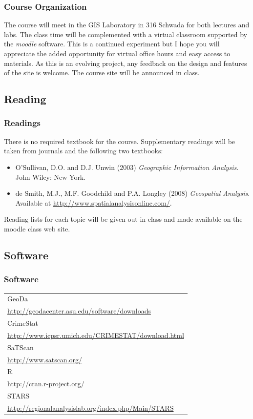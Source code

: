 \documentclass[nototal,handout]{beamer}
\begin{document}
\begin{frame}
	\frametitle{Course Organization}
  The course will meet in the GIS Laboratory in 316 Schwada for both
  lectures and labs. The class time will be complemented with a
  virtual classroom supported by the \emph{moodle} software. This is a
  continued experiment but I hope you will appreciate the added
  opportunity for virtual office hours and easy access to materials.
  As this is an evolving project, any feedback on the design and
  features of the site is welcome. The course site will be announced
  in class.
 \end{frame} 

\subsection{Reading} 

\begin{frame}
	\frametitle{Readings}
 There is no required textbook for the course. Supplementary readings will be
 taken from journals and the following two textbooks:
 \begin{itemize}
 \item O'Sullivan, D.O. and D.J. Unwin (2003) \emph{Geographic Information
   Analysis}. John Wiley: New York. 
 \item de Smith, M.J., M.F. Goodchild and P.A. Longley (2008) \emph{Geospatial
   Analysis}. Available at \url{http://www.spatialanalysisonline.com/}.
 \end{itemize}
 Reading lists for each topic will be given out in class and made available on
 the moodle class web site.
 \end{frame} 

\subsection{Software} 

\begin{frame}
	\frametitle{Software}
  \centering
 \begin{tabular}{l}
  GeoDa\\
    \url{http://geodacenter.asu.edu/software/downloads}
    \\ \hline
   CrimeStat \\
    \url{http://www.icpsr.umich.edu/CRIMESTAT/download.html}
    \\ \hline
   SaTScan\\
   \url{http://www.satscan.org/}
   \\ \hline
   R\\
    \url{http://cran.r-project.org/}
    \\
    \hline
   STARS
   \\
    \url{http://regionalanalysislab.org/index.php/Main/STARS}	
    \\
    \hline
 \end{tabular}
 \end{frame} 
\end{document}
